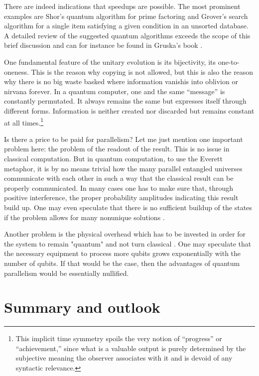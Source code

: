\documentclass [11pt]{llncs}
\begin{document}
There are indeed indications that speedups are possible. The most prominent examples
are Shor's quantum algorithm for prime factoring
\cite{shor:94,ekerj96} and  Grover's  search algorithm \cite{grover}
for a single item satisfying a given condition in an unsorted database.
A detailed review of the suggested quantum algorithms exceeds the scope of this brief discussion
and can for instance be found in Gruska's book \cite{Gruska}.

One fundamental feature of the unitary evolution is its bijectivity, its one-to-oneness.
This is the reason why copying is not allowed, but this is also the reason why there is
no big waste basked where information vanishis into oblivion or nirvana forever.
In a quantum computer, one and the same ``message'' is constantly permutated.
It always remains the same but expresses itself through different forms.
Information is neither created nor discarded but remains constant at all times.\footnote{This
implicit time symmetry spoils the very notion of
``progress'' or ``achievement,''  since what
is a valuable output is purely determined by the
subjective meaning the observer associates with it and is devoid of any
syntactic relevance.}

Is there a price to be paid for parallelism?
Let me just mention one important problem here: the problem of the  readout of the result.
This is no issue in classical computation.
But in quantum computation, to use the Everett metaphor, it is by no means trivial how the
many parallel entangled universes communicate with each other in such a way that the classical
result can be properly communicated.
In many cases one has to make sure that, through positive interference, the proper probability amplitudes
indicating this result build up.
One may even speculate that there is no sufficient buildup of the states if the problem
allows for many nonunique solutions \cite{gottlob,cal-mike-svo}.

Another problem is the physical overhead which has to be invested in order for the system to remain "quantum"
and not turn classical \cite{mahler-priv}.
One may speculate that  the necessary equipment to process more qubits
grows exponentially with the number of qubits.
If that would be the case, then the advantages of quantum parallelism would be essentially nullified.

\section{Summary and outlook}
\end{document}
